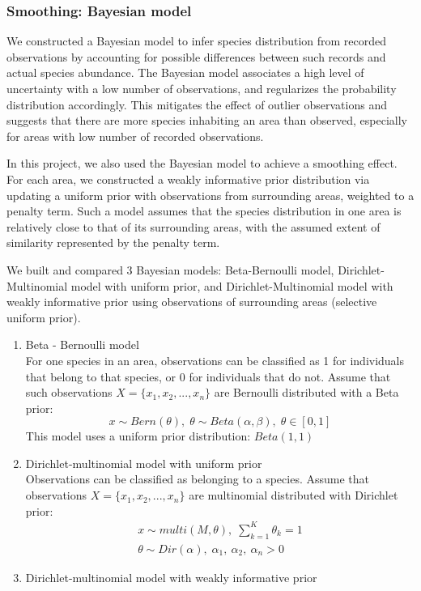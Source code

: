\documentclass{article}
\begin{document}
\subsubsection{Smoothing: Bayesian model}
We constructed a Bayesian model to infer species distribution from recorded observations by accounting for possible differences between such records and actual species abundance. The Bayesian model associates a high level of uncertainty with a low number of observations, and regularizes the probability distribution accordingly. This mitigates the effect of outlier observations and suggests that there are more species inhabiting an area than observed, especially for areas with low number of recorded observations.
\par
In this project, we also used the Bayesian model to achieve a smoothing effect. For each area, we constructed a weakly informative prior distribution via updating a uniform prior with observations from surrounding areas, weighted to a penalty term. Such a model assumes that the species distribution in one area is relatively close to that of its surrounding areas, with the assumed extent of similarity represented by the penalty term.
\par
We built and compared 3 Bayesian models: Beta-Bernoulli model, Dirichlet-Multinomial model with uniform prior, and Dirichlet-Multinomial model with weakly informative prior using observations of surrounding areas (selective uniform prior).
\begin{enumerate}
	\item Beta - Bernoulli model\\
	For one species in an area, observations can be classified as 1 for individuals that belong to that species, or 0 for individuals that do not.  Assume that such observations $X = \{x_1, x_2,...,x_n\}$  are Bernoulli distributed with a Beta prior:
	\begin{equation}
		x \sim Bern(\theta), \; \theta \sim Beta(\alpha, \beta), \; \theta \in [0,1]
	\end{equation}
	This model uses a uniform prior distribution: $Beta(1,1)$
	
	\item Dirichlet-multinomial model with uniform prior\\
	Observations can be classified as belonging to a species. Assume that observations $X = \{x_1, x_2,...,x_n\}$ are multinomial distributed with Dirichlet prior:
	\begin{gather}
		x \sim multi(M, \theta), \; \sum_{k=1}^{K} \theta_k = 1 \\
		\theta \sim Dir(\alpha), \; \alpha_1, \: \alpha_2, \: \alpha_n > 0
	\end{gather}
	\item Dirichlet-multinomial model with weakly informative prior
\end{enumerate}
\end{document}
